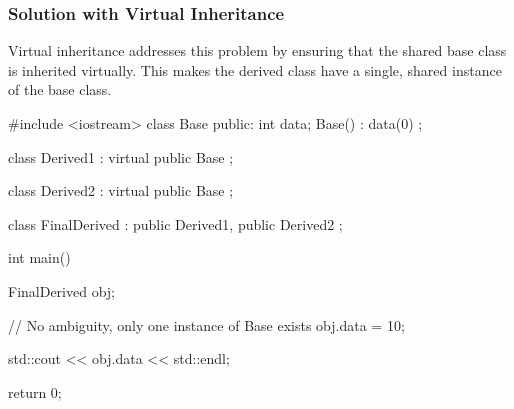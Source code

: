 \documentclass{report}
\begin{document}
    \subsubsection{Solution with Virtual Inheritance}
    \bigbreak \noindent 
    Virtual inheritance addresses this problem by ensuring that the shared base class is inherited virtually. This makes the derived class have a single, shared instance of the base class.
    \bigbreak \noindent 
    \begin{cppcode}
#include <iostream>
class Base {
public:
    int data;
    Base() : data(0) {}
};

class Derived1 : virtual public Base {};

class Derived2 : virtual public Base {};

class FinalDerived : public Derived1, public Derived2 {};

int main() {
    FinalDerived obj;

    // No ambiguity, only one instance of Base exists
    obj.data = 10;

    std::cout << obj.data << std::endl;

    return 0;
}
    \end{cppcode}
\end{document}
